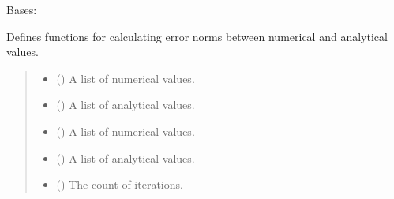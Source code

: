 \documentclass[a4paper,11pt,english,openany]{sphinxmanual}
\begin{document}
\sphinxstepscope
{}\label{\detokenize{api/spyice.utils.error_norms:module-spyice.utils.error_norms}}

\begin{fulllineitems}
\label{\detokenize{api/spyice.utils.error_norms:spyice.utils.error_norms.ErrorNorms}}
\pysigstartsignatures
{}
\pysigstopsignatures
\sphinxAtStartPar
Bases: 

\sphinxAtStartPar
Defines functions for calculating error norms between numerical and analytical values.
\begin{quote}\begin{description}
\begin{itemize}
\item {} 
\sphinxAtStartPar
{} () \textendash{} A list of numerical values.

\item {} 
\sphinxAtStartPar
{} () \textendash{} A list of analytical values.

\end{itemize}

\begin{itemize}
\item {} 
\sphinxAtStartPar
{} () \textendash{} A list of numerical values.

\item {} 
\sphinxAtStartPar
{} () \textendash{} A list of analytical values.

\item {} 
\sphinxAtStartPar
{} () \textendash{} The count of iterations.


\end{itemize}
\end{description}
\end{quote}
\end{fulllineitems}
\end{document}
